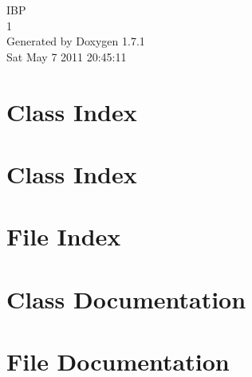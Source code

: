 \documentclass[a4paper]{book}
\begin{document}
\hypersetup{pageanchor=false}
\begin{titlepage}
\vspace*{7cm}
\begin{center}
{\Large IBP \\[1ex]\large 1 }\\
\vspace*{1cm}
{\large Generated by Doxygen 1.7.1}\\
\vspace*{0.5cm}
{\small Sat May 7 2011 20:45:11}\\
\end{center}
\end{titlepage}
\clearemptydoublepage
{}
\tableofcontents
\clearemptydoublepage
{}
\hypersetup{pageanchor=true}
\chapter{Class Index}

\chapter{Class Index}

\chapter{File Index}

\chapter{Class Documentation}








\chapter{File Documentation}














\printindex
\end{document}
